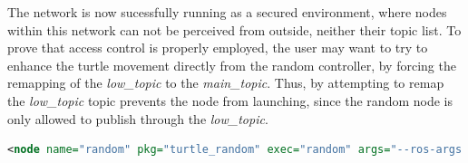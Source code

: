 The network is now sucessfully running as a secured environment, where nodes within this network can not be perceived from outside, neither their topic list. To prove that access control is properly employed, the user may want to try to enhance the turtle movement directly from the random controller, by forcing the remapping of the \textit{low\_topic} to the \textit{main\_topic}. Thus, by attempting to remap the \textit{low\_topic} topic prevents the node from launching, since the random node is only allowed to publish through the \textit{low\_topic}. 

\begin{lstlisting}[title={Attempting the \textit{low\_topic} remap.}, language=xml]
<node name="random" pkg="turtle_random" exec="random" args="--ros-args --enclave /random -r /low_topic:=/main_topic"/>
\end{lstlisting}

